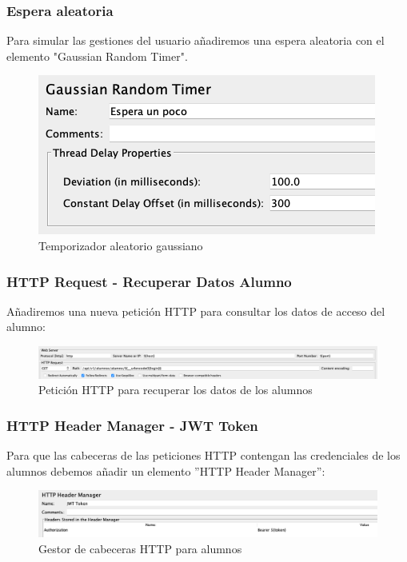 \subsubsection{Espera aleatoria}
Para simular las gestiones del usuario añadiremos una espera aleatoria con el elemento "Gaussian Random Timer".
\begin{figure}[H]
    \centering
    \includegraphics[scale=0.6]{images/timer.png}
    \caption{Temporizador aleatorio gaussiano}
    \label{fig:timer}
\end{figure}

\subsubsection{HTTP Request - Recuperar Datos Alumno}
Añadiremos una nueva petición HTTP para consultar los datos de acceso del alumno:
\begin{figure}[H]
    \centering
    \includegraphics[scale=0.33]{images/recuperar_alumnos.png}
    \caption{Petición HTTP para recuperar los datos de los alumnos}
    \label{fig:recuperar_alumnos}
\end{figure}

\subsubsection{HTTP Header Manager - JWT Token}
Para que las cabeceras de las peticiones HTTP contengan las credenciales de los alumnos debemos añadir un elemento ''HTTP Header Manager'': 
\begin{figure}[H]
    \centering  
    \includegraphics[scale=0.33]{images/header_alumnos.png}
    \caption{Gestor de cabeceras HTTP para alumnos}
    \label{fig:header_alumnos}
\end{figure}

